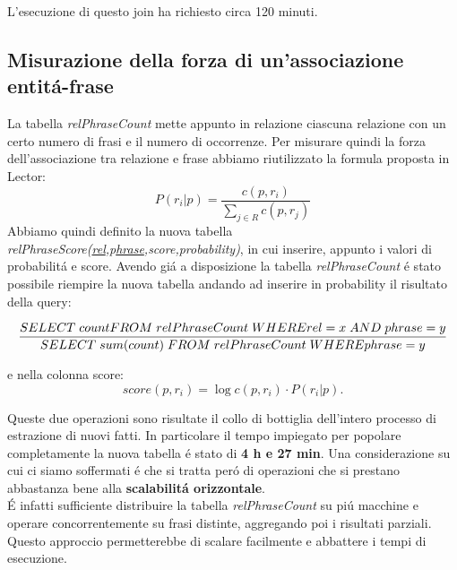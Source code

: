 \documentclass[twocolumn,10pt]{asme2ej}
\begin{document}
L'esecuzione di questo join ha richiesto circa 120 minuti.

\subsection{Misurazione della forza  di un'associazione entit\'a-frase}
La tabella \textit{relPhraseCount} mette appunto in relazione ciascuna relazione con un certo numero di frasi e il numero di occorrenze. Per misurare quindi la forza dell'associazione tra relazione e frase abbiamo riutilizzato la formula proposta in Lector:
\begin{equation}
P(r_i|p) =  \frac{c(p,r_i)}{\sum_{j\in{R}}c(p,r_j)}
\end{equation}
Abbiamo quindi definito la nuova tabella \textit{relPhraseScore(\underline{rel},p\underline{hrase},score,probability)}, in cui inserire, appunto i valori di probabilit\'a e score. Avendo gi\'a a disposizione la tabella \textit{relPhraseCount} \'e stato possibile riempire la nuova tabella andando ad inserire in probability il risultato della query:

\begin{equation}
\scriptsize{\frac{SELECT \hspace{0.1cm} count  FROM  \hspace{0.1cm} relPhraseCount \hspace{0.1cm} WHERE rel=x \hspace{0.1cm} AND \hspace{0.1cm} phrase=y}{SELECT \hspace{0.1cm} sum(count) \hspace{0.1cm} FROM  \hspace{0.1cm} relPhraseCount \hspace{0.1cm} WHERE  phrase=y}}
\end{equation}

e nella colonna score:
\begin{equation}
score(p,r_i)=\log{c(p,r_i)\cdot{P(r_i|p)}}.
\end{equation}

Queste due operazioni sono risultate il collo di bottiglia dell'intero processo di estrazione di nuovi fatti. In particolare il tempo impiegato per popolare completamente la nuova tabella \'e stato di \textbf{4 h e 27 min}. Una considerazione su cui ci siamo soffermati \'e che si tratta per\'o di operazioni che si prestano abbastanza bene alla \textbf{scalabilit\'a orizzontale}. \\ \'E infatti sufficiente distribuire la tabella \textit{relPhraseCount} su pi\'u macchine e operare concorrentemente su frasi distinte, aggregando poi i risultati parziali. Questo approccio permetterebbe di scalare facilmente e abbattere i tempi di esecuzione.
\end{document}
